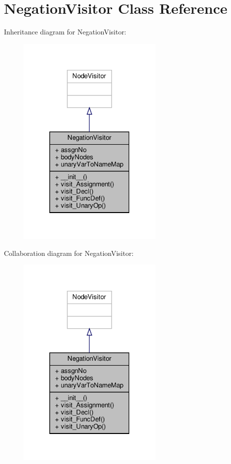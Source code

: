 \hypertarget{classPostProcessor_1_1Visitor_1_1NegationVisitor}{}\section{Negation\+Visitor Class Reference}
\label{classPostProcessor_1_1Visitor_1_1NegationVisitor}


Inheritance diagram for Negation\+Visitor\+:\nopagebreak
\begin{figure}[H]
\begin{center}
\leavevmode
\includegraphics[width=201pt]{classPostProcessor_1_1Visitor_1_1NegationVisitor__inherit__graph}
\end{center}
\end{figure}


Collaboration diagram for Negation\+Visitor\+:\nopagebreak
\begin{figure}[H]
\begin{center}
\leavevmode
\includegraphics[width=201pt]{classPostProcessor_1_1Visitor_1_1NegationVisitor__coll__graph}
\end{center}
\end{figure}
